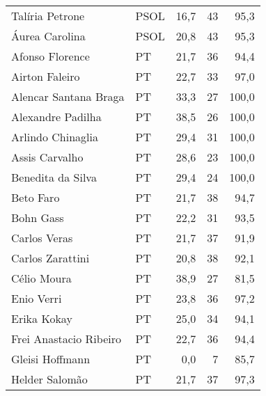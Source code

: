 \begin{longtable}{llrrr}
                     Talíria Petrone &           PSOL &      16,7 &           43 &       95,3 \\
                      Áurea Carolina &           PSOL &      20,8 &           43 &       95,3 \\
                     Afonso Florence &             PT &      21,7 &           36 &       94,4 \\
                      Airton Faleiro &             PT &      22,7 &           33 &       97,0 \\
               Alencar Santana Braga &             PT &      33,3 &           27 &      100,0 \\
                   Alexandre Padilha &             PT &      38,5 &           26 &      100,0 \\
                   Arlindo Chinaglia &             PT &      29,4 &           31 &      100,0 \\
                      Assis Carvalho &             PT &      28,6 &           23 &      100,0 \\
                   Benedita da Silva &             PT &      29,4 &           24 &      100,0 \\
                           Beto Faro &             PT &      21,7 &           38 &       94,7 \\
                           Bohn Gass &             PT &      22,2 &           31 &       93,5 \\
                        Carlos Veras &             PT &      21,7 &           37 &       91,9 \\
                    Carlos Zarattini &             PT &      20,8 &           38 &       92,1 \\
                         Célio Moura &             PT &      38,9 &           27 &       81,5 \\
                          Enio Verri &             PT &      23,8 &           36 &       97,2 \\
                         Erika Kokay &             PT &      25,0 &           34 &       94,1 \\
              Frei Anastacio Ribeiro &             PT &      22,7 &           36 &       94,4 \\
                     Gleisi Hoffmann &             PT &       0,0 &            7 &       85,7 \\
                      Helder Salomão &             PT &      21,7 &           37 &       97,3 \\

\end{longtable}

